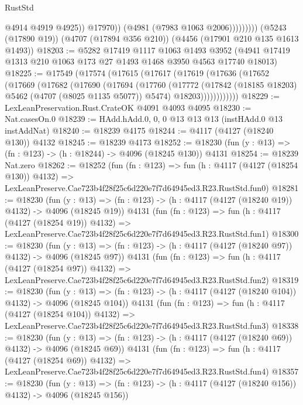 \begin{lexlean}{RustStd}
\begin{coremodule}
                          @4914
                          @4919
                          @4925))
                      @17970))
                  (@4981 (@7983 @1063 @2006)))))))))
    (@5243 (@17890 @19))
    (@4707 (@17894 @356 @210))
    (@4456 (@17901 @210 @135 @1613 @1493))
@18203 := @5282
    @17419
    @1117
    @1063
    @1493
    @3952
    (@4941 @17419 @1313 @210 @1063 @173 @27 @1493 @1468 @3950 @4563 @17740 @18013)
@18225 := @17549
    (@17574
      (@17615
        (@17617
          (@17619
            (@17636
              (@17652
                (@17669
                  (@17682
                    (@17690
                      (@17694
                        (@17760
                          (@17772
                            (@17842 (@18185 @18203) @5462 (@4707 (@8025 @1135 @5077)) @5474)
                            @18203))))))))))))
@18229 := LexLeanPreservation.Rust.CrateOK @4091 @4093 @4095
@18230 := Nat.casesOn.{0}
@18239 := HAdd.hAdd.{0, 0, 0} @13 @13 @13 (instHAdd.{0} @13 instAddNat)
@18240 := @18239 @4175
@18244 := @4117 (@4127 (@18240 @130)) @4132
@18245 := @18239 @4173
@18252 := @18230 (fun (y : @13) => (fn : @123) -> (h : @18244) -> @4096 (@18245 @130)) @4131
@18254 := @18239 Nat.zero
@18262 := @18252
    (fun (fn : @123) =>
    fun (h : @4117 (@4127 (@18254 @130)) @4132) =>
    LexLeanPreserve.Cae723b4f28f25c6d220e7f7d64945ed3.R23.RustStd.fun0)
@18281 := @18230
    (fun (y : @13) => (fn : @123) -> (h : @4117 (@4127 (@18240 @19)) @4132) -> @4096 (@18245 @19))
    @4131
    (fun (fn : @123) =>
    fun (h : @4117 (@4127 (@18254 @19)) @4132) =>
    LexLeanPreserve.Cae723b4f28f25c6d220e7f7d64945ed3.R23.RustStd.fun1)
@18300 := @18230
    (fun (y : @13) => (fn : @123) -> (h : @4117 (@4127 (@18240 @97)) @4132) -> @4096 (@18245 @97))
    @4131
    (fun (fn : @123) =>
    fun (h : @4117 (@4127 (@18254 @97)) @4132) =>
    LexLeanPreserve.Cae723b4f28f25c6d220e7f7d64945ed3.R23.RustStd.fun2)
@18319 := @18230
    (fun (y : @13) => (fn : @123) -> (h : @4117 (@4127 (@18240 @104)) @4132) -> @4096 (@18245 @104))
    @4131
    (fun (fn : @123) =>
    fun (h : @4117 (@4127 (@18254 @104)) @4132) =>
    LexLeanPreserve.Cae723b4f28f25c6d220e7f7d64945ed3.R23.RustStd.fun3)
@18338 := @18230
    (fun (y : @13) => (fn : @123) -> (h : @4117 (@4127 (@18240 @69)) @4132) -> @4096 (@18245 @69))
    @4131
    (fun (fn : @123) =>
    fun (h : @4117 (@4127 (@18254 @69)) @4132) =>
    LexLeanPreserve.Cae723b4f28f25c6d220e7f7d64945ed3.R23.RustStd.fun4)
@18357 := @18230
    (fun (y : @13) => (fn : @123) -> (h : @4117 (@4127 (@18240 @156)) @4132) -> @4096 (@18245 @156))

\end{coremodule}
\end{lexlean}

